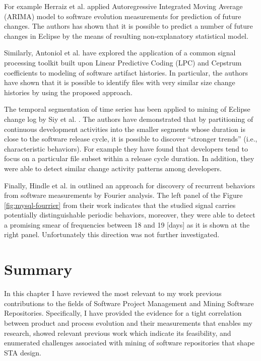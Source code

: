For example Herraiz et al. \cite{citeulike:6544685} applied Autoregressive Integrated Moving Average (ARIMA) model 
to software evolution measurements for prediction of future changes. The authors has shown that it is possible to 
predict a number of future changes in Eclipse by the means of resulting non-explanatory statistical model. 

Similarly, Antoniol et al. \cite{citeulike:3378725} have explored the application of a common signal processing toolkit 
built upon Linear Predictive Coding (LPC) and Cepstrum coefficients to modeling of software artifact histories. 
In particular, the authors have shown that it is possible to identify files with very similar size change histories 
by using the proposed approach.

The temporal segmentation of time series has been applied to mining of Eclipse change log by Siy et al. \cite{citeulike:10896305}.
The authors have demonstrated that by partitioning of continuous development activities into the smaller segments whose duration 
is close to the software release cycle, it is possible to discover ``stronger trends'' (i.e., characteristic behaviors). 
For example they have found that developers tend to focus on a particular file subset within a release cycle duration. 
In addition, they were able to detect similar change activity patterns among developers.

Finally, Hindle et al. in \cite{citeulike:10377345} outlined an approach for discovery of recurrent behaviors from software 
measurements by Fourier analysis. 
The left panel of the Figure \ref{fig:mysql-fourrier} from their work indicates that the studied signal carries potentially 
distinguishable periodic behaviors, moreover, they were able to detect a promising smear of frequencies between 18 and 19 
[days] as it is shown at the right panel. Unfortunately this direction was not further investigated.

\section{Summary}
In this chapter I have reviewed the most relevant to my work previous contributions to the fields of Software Project Management 
and Mining Software Repositories. Specifically, I have provided the evidence for a tight correlation between product and process evolution 
and their measurements that enables my research, showed relevant previous work which indicate its feasibility,
and enumerated challenges associated with mining of software repositories that shape STA design. 

